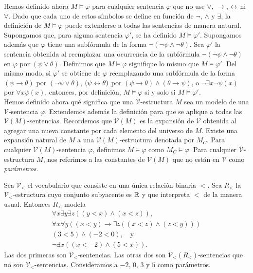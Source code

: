 \message{ !name(main.tex)}\documentclass[12pt,a4paper]{book}
\newcommand{\VV}{\mathcal{V}}
\begin{document}
    Hemos definido ahora $M\models\varphi$ para cualquier sentencia $\varphi$ que no use $\vee$, $\rightarrow$, $\leftrightarrow$ ni
    $\forall$. Dado que cada uno de estos símbolos se define en función de $\neg$, $\wedge$ y $\exists$, la definición de
    $M\models\varphi$ puede extenderse a todas las sentencias de manera natural. Supongamos que, para alguna sentencia
    $\varphi'$, se ha definido $M\models\varphi'$. Supongamos además que $\varphi$ tiene una subfórmula de la forma
    $\neg(\neg\psi\wedge\neg\theta)$. Sea $\varphi'$ la sentencia obtenida al reemplazar una ocurrencia de la subfórmula
    $\neg(\neg\psi\wedge\neg\theta)$ en $\varphi$ por $(\psi\vee\theta)$. Definimos que $M\models\varphi$ signifique lo
    mismo que $M\models\varphi'$. Del mismo modo, si $\varphi'$ se obtiene de $\varphi$ reemplazando una subfórmula de la
    forma $(\psi\rightarrow\theta)$ por $(\neg\psi\vee\theta)$, $(\psi\leftrightarrow\theta)$ por $(\psi\rightarrow\theta)\wedge(\theta\rightarrow\psi)$,
    o $\neg\exists x\neg\psi(x)$ por $\forall x\psi(x)$, entonces, por definición, $M\models\varphi$ si y solo si
    $M\models\varphi'$.\\
    Hemos definido ahora qué significa que una $\VV$-estructura $M$ sea un modelo de una $\VV$-sentencia $\varphi$.
    Extendemos además la definición para que se aplique a todas las $\VV(M)$-sentencias. Recordemos que $\VV(M)$ es la
    expansión de $\VV$ obtenida al agregar una nueva constante por cada elemento del universo de $M$. Existe una expansión
    natural de $M$ a una $\VV(M)$-estructura denotada por $M_{C}$. Para cualquier $\VV(M)$-sentencia $\varphi$, definimos
    $M\models\varphi$ como $M_{C}\models\varphi$. Para cualquier $\VV$-estructura $M$, nos referimos a las constantes de
    $\VV(M)$ que no están en $\VV$ como \textit{parámetros}.

    \begin{ejemplo}\label{ej:parametros}
        Sea $\VV_{<}$ el vocabulario que consiste en una única relación binaria $<$. Sea $R_{<}$ la $\VV_{<}$-estructura
        cuyo conjunto subyacente es $\mathbb{R}$ y que interpreta $<$ de la manera usual. Entonces $R_{<}$ modela
        \begin{gather*}
            \forall x\exists y\exists z((y<x)\wedge(x<z)),\\
            \forall x\forall y((x<y)\rightarrow\exists z((x<z)\wedge(z<y)))\\
            (3<5)\wedge(-2<0),\quad\text{y}\\
            \neg\exists x((x<-2)\wedge(5<x)).
        \end{gather*}
        Las dos primeras son $\VV_{<}$-sentencias. Las otras dos son $\VV_{<}(R_{<})$-sentencias que no son
        $\VV_{<}$-sentencias. Consideramos a $-2$, $0$, $3$ y $5$ como parámetros.
    \end{ejemplo}
\end{document}
